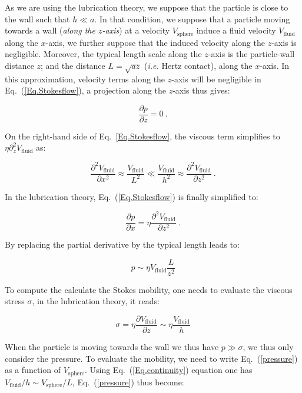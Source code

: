 As we are using the lubrication theory, we suppose that the particle is close to the wall such that $h \ll a$. In that condition, we suppose that a particle moving towards a wall (\textit{along the $z$-axis}) at a velocity $V_\mathrm{sphere}$ induce a fluid velocity $V_\mathrm{fluid}$ along the $x$-axis, we further suppose that the induced velocity along the $z$-axis is negligible. Moreover, the typical length scale along the $z$-axis is the particle-wall distance $z$; and the distance $L=\sqrt{az}$ (\textit{i.e.} Hertz contact), along the $x$-axis. In this approximation, velocity terms along the $z$-axis will be negligible in Eq.~(\ref{Eq.Stokesflow}), a projection along the $z$-axis thus gives:

\begin{equation}
	\frac{\partial p}{\partial z} = 0 ~.
\end{equation}

On the right-hand side of Eq.~\ref{Eq.Stokesflow}, the viscous term simplifies to $\eta \partial_z^2 V_\mathrm{fluid} $ as:

\begin{equation}
	\frac{\partial^2 V_\mathrm{fluid}}{\partial x^2} \approx \frac{V_\mathrm{fluid}}{L^2} \ll \frac{V_\mathrm{fluid}}{h^2} \approx \frac{\partial^2 V_\mathrm{fluid}}{\partial z^2}~.
\end{equation}

In the lubrication theory, Eq.~(\ref{Eq.Stokesflow}) is finally simplified to:

\begin{equation}
	\frac{\partial p}{\partial x} = \eta \frac{\partial ^2 V_\mathrm{fluid}}{\partial z^2}~.
\end{equation}

By replacing the partial derivative by the typical length leads to:

\begin{equation}
	p \sim \eta V_\mathrm{fluid} \frac{L}{z^2}
	\label{pressure}
\end{equation}

To compute the calculate the Stokes mobility, one needs to evaluate the viscous stress $\sigma$, in the lubrication theory, it reads:

\begin{equation}
	\sigma = \eta \frac{\partial V_\mathrm{fluid}}{\partial z} \sim \eta \frac{V_\mathrm{fluid}}{h}
\end{equation}

When the particle is moving towards the wall we thus have $p\gg \sigma$, we thus only consider the pressure. To evaluate the mobility, we need to write Eq.~(\ref{pressure}) as a function of $V_\mathrm{sphere}$. Using Eq.~(\ref{Eq.continuity}) equation one has $V_\mathrm{fluid} / h \sim  V_\mathrm{sphere} / L$, Eq.~(\ref{pressure}) thus become:

